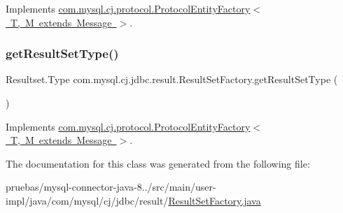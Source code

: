 Implements \mbox{\hyperlink{interfacecom_1_1mysql_1_1cj_1_1protocol_1_1_protocol_entity_factory_ab5bf153eafa066fe2d98fd6bd8372972}{com.\+mysql.\+cj.\+protocol.\+Protocol\+Entity\+Factory$<$ T, M extends Message $>$}}.

\mbox{\label{classcom_1_1mysql_1_1cj_1_1jdbc_1_1result_1_1_result_set_factory_a09f8de6edd7696e5095a1b04ae26c573}} 
\subsubsection{\texorpdfstring{get\+Result\+Set\+Type()}{getResultSetType()}}
{\footnotesize\ttfamily Resultset.\+Type com.\+mysql.\+cj.\+jdbc.\+result.\+Result\+Set\+Factory.\+get\+Result\+Set\+Type (\begin{DoxyParamCaption}{ }\end{DoxyParamCaption})}



Implements \mbox{\hyperlink{interfacecom_1_1mysql_1_1cj_1_1protocol_1_1_protocol_entity_factory_a288de4370d4af19186625e7404b4cca5}{com.\+mysql.\+cj.\+protocol.\+Protocol\+Entity\+Factory$<$ T, M extends Message $>$}}.



The documentation for this class was generated from the following file\+:\begin{DoxyCompactItemize}
\item 
pruebas/mysql-\/connector-\/java-\/8../src/main/user-\/impl/java/com/mysql/cj/jdbc/result/\mbox{\hyperlink{user-impl_2java_2com_2mysql_2cj_2jdbc_2result_2_resultset_factory_8java}{Result\+Set\+Factory.\+java}}\end{DoxyCompactItemize}
